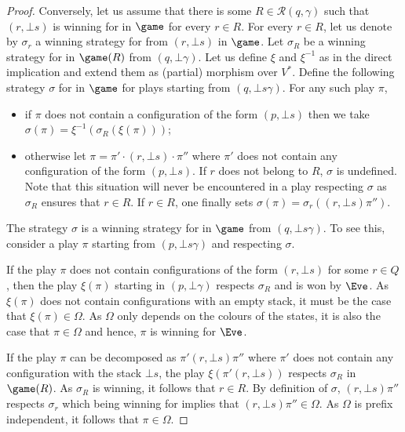 \begin{proof}
Conversely, let us assume that there is some $R\in\mathcal{R}(q,\gamma)$ such that $(r,\bot s)$ is winning for \Eve in $\game$ for every $r\in R$. For every $r\in R$, let us denote by $\sigma_r$ a winning strategy for \Eve from $(r,\bot s)$ in $\game$. Let $\sigma_R$ be a winning strategy for \Eve in $\game(R)$ from $(q,\bot\gamma)$. Let us define $\xi$ and $\xi^{-1}$ as in the direct implication and extend them as (partial) morphism over $V^*$. Define the following strategy $\sigma$ for \Eve in $\game$ for plays starting from $(q,\bot s\gamma)$. For any such play $\pi$, 
\begin{itemize}
\item if $\pi$ does not contain a configuration of the form $(p,\bot s)$ then we take $\sigma(\pi)=\xi^{-1}(\sigma_R(\xi(\pi)))$;
\item otherwise let $\pi = \pi'\cdot(r,\bot s)\cdot \pi''$ where $\pi'$ does not contain any configuration of the form $(p,\bot s)$. If $r$ does not belong to $R$, $\sigma$ is undefined. Note that this situation will never be encountered in a play respecting $\sigma$ as $\sigma_R$ ensures that $r \in R$. If $r \in R$, one finally sets $\sigma(\pi)=\sigma_r((r,\bot s)\pi'')$.
\end{itemize} 
The strategy $\sigma$ is a winning strategy for \Eve in $\game$ from $(q,\bot s\gamma)$. To see this, consider a play $\pi$ starting from $(p,\bot s \gamma)$ and respecting $\sigma$.

 If the play $\pi$ does not contain configurations of the form $(r,\bot s)$ for some $r \in Q$, then the play $\xi(\pi)$ starting in $(p,\bot \gamma)$ respects $\sigma_R$ and is won by $\Eve$.
As $\xi(\pi)$ does not contain configurations with an empty stack, it must be the case that $\xi(\pi) \in \Omega$. As $\Omega$ only depends on the colours of the states, it is also the case that $\pi \in \Omega$ and hence, $\pi$ is winning for $\Eve$. 

If the play $\pi$ can be decomposed as $\pi' (r,\bot s) \pi''$ where $\pi'$ does not contain any configuration with the stack $\bot s$, the play $\xi(\pi' (r,\bot s))$ respects $\sigma_R$ in $\game(R)$. As $\sigma_R$ is winning, it follows that $r \in R$. By definition of $\sigma$, $(r,\bot s)\pi''$ respects $\sigma_r$ which being winning for \Eve implies that $(r,\bot s) \pi'' \in \Omega$. As $\Omega$ is prefix independent, it follows that $\pi \in \Omega$.
\end{proof}


